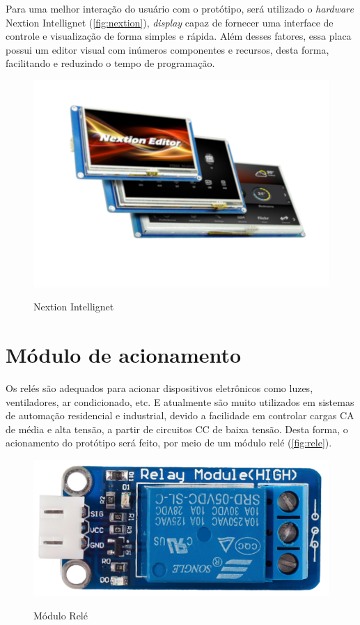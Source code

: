 Para uma melhor interação do usuário com o protótipo, será utilizado o \textit{hardware} 
Nextion Intellignet (\autoref{fig:nextion}), \textit{display} capaz de fornecer uma interface de controle e visualização 
de forma simples e rápida. Além desses fatores, essa placa possui um editor visual 
com inúmeros componentes e recursos, desta forma, facilitando e reduzindo o tempo 
de programação.

\begin{figure}[h!]
    \centering
    \caption{Nextion Intellignet}
    \includegraphics[scale=0.3]{figuras/nextion.png} 
    \label{fig:nextion}
    \centering
\end{figure}

\section{Módulo de acionamento}\label{sec:materiais}

Os relés são adequados para acionar dispositivos eletrônicos como luzes, 
ventiladores, ar condicionado, etc. E atualmente são muito 
utilizados em sistemas de automação residencial e industrial, devido a 
facilidade em controlar cargas CA de média e alta tensão, a partir de 
circuitos CC de baixa tensão. Desta forma, o acionamento do protótipo 
será feito, por meio de um módulo relé (\autoref{fig:rele}).

\begin{figure}[h!]
    \centering
    \caption{Módulo Relé}
    \includegraphics[scale=1]{figuras/rele.png} 
    \label{fig:rele}
    \centering
\end{figure}

